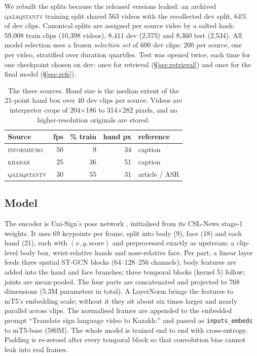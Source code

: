 \documentclass[11pt,twocolumn,a4paper]{article}
\newcommand{\src}[1]{\textsc{#1}}
\newcommand{\ib}{\src{informburo}}
\newcommand{\kh}{\src{khabar}}
\newcommand{\qz}{\src{qazaqstantv}}
\begin{document}
We rebuilt the splits because the released versions leaked: an archived \qz{} training split shared 563 videos with the recollected dev split, 64\% of dev clips. Canonical splits are assigned per source video by a salted hash: 59{,}008 train clips (10{,}398 videos), 8{,}411 dev (2{,}575) and 8{,}360 test (2{,}534). All model selection uses a frozen \emph{selection set} of 600 dev clips: 200 per source, one per video, stratified over duration quartiles. Test was opened twice, each time for one checkpoint chosen on dev: once for retrieval (\S\ref{sec:retrieval}) and once for the final model (\S\ref{sec:refs}).

\begin{table}[t]
\centering\small
\setlength{\tabcolsep}{4pt}
\begin{tabular}{lrrrl}
\toprule
Source & fps & \% train & hand px & reference \\
\midrule
\ib & 50 & 9 & 34 & caption \\
\kh & 25 & 36 & 51 & caption \\
\qz & 30 & 55 & 31 & article / ASR \\
\bottomrule
\end{tabular}
\caption{The three sources. Hand size is the median extent of the 21-point hand box over 40 dev clips per source. Videos are interpreter crops of 204$\times$186 to 314$\times$282 pixels, and no higher-resolution originals are stored.}
\label{tab:data}
\end{table}

\subsection{Model}

The encoder is Uni-Sign's pose network \citep{li2025unisign}, initialised from its CSL-News stage-1 weights. It uses 69 keypoints per frame, split into body (9), face (18) and each hand (21), each with $(x, y, \text{score})$ and preprocessed exactly as upstream: a clip-level body box, wrist-relative hands and nose-relative face. Per part, a linear layer feeds three spatial ST-GCN blocks \citep{yan2018stgcn} (64--128--256 channels); body features are added into the hand and face branches; three temporal blocks (kernel 5) follow; joints are mean-pooled. The four parts are concatenated and projected to 768 dimensions (5.3M parameters in total). A LayerNorm brings the features to mT5's embedding scale; without it they sit about six times larger and nearly parallel across clips. The normalised frames are appended to the embedded prompt ``Translate sign language video to Kazakh:'' and passed as \texttt{inputs\_embeds} to mT5-base \citep{xue2021mt5} (580M). The whole model is trained end to end with cross-entropy. Padding is re-zeroed after every temporal block so that convolution bias cannot leak into real frames.
\end{document}
